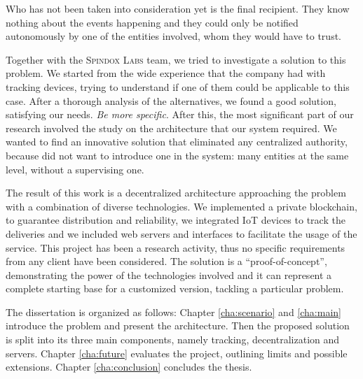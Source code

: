 Who has not been taken into consideration yet is the final recipient. They know nothing about the events happening and they could only be notified autonomously by one of the entities involved, whom they would have to trust. 

Together with the \textsc{Spindox Labs} team, we tried to investigate a solution to this problem. We started from the wide experience that the company had with tracking devices, trying to understand if one of them could be applicable to this case. After a thorough analysis of the alternatives, we found a good solution, satisfying our needs. \textit{Be more specific}. After this, the most significant part of our research involved the study on the architecture that our system required. We wanted to find an innovative solution that eliminated any centralized authority, because did not want to introduce one in the system: many entities at the same level, without a supervising one. 

The result of this work is a decentralized architecture approaching the problem with a combination of diverse technologies. We implemented a private blockchain, to guarantee distribution and reliability, we integrated IoT devices to track the deliveries and we included web servers and interfaces to facilitate the usage of the service. This project has been a research activity, thus no specific requirements from any client have been considered. The solution is a ``proof-of-concept'', demonstrating the power of the technologies involved and it can represent a complete starting base for a customized version, tackling a particular problem.

The dissertation is organized as follows: Chapter \ref{cha:scenario} and \ref{cha:main} introduce the problem and present the architecture. Then the proposed solution is split into its three main components, namely tracking, decentralization and servers. Chapter \ref{cha:future} evaluates the project, outlining limits and possible extensions. Chapter \ref{cha:conclusion} concludes the thesis.

\newpage